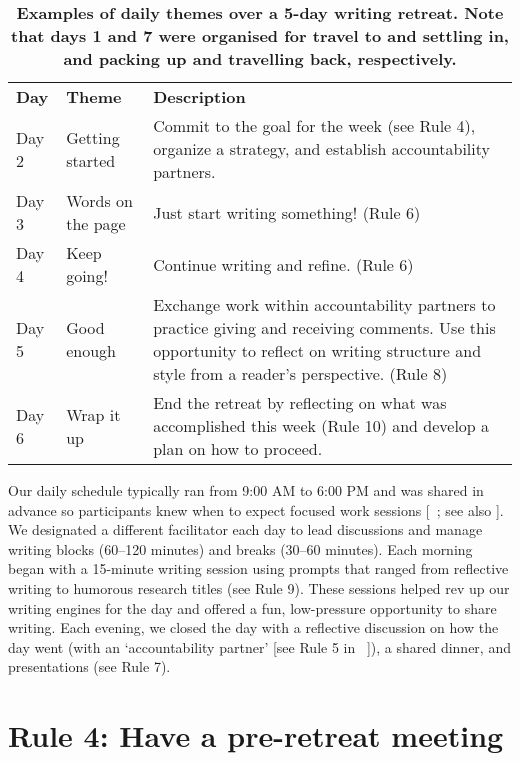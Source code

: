 \documentclass[10pt,letterpaper]{article}
\newlength\savedwidth
\newcommand\thickhline{\noalign{\global\savedwidth\arrayrulewidth\global\arrayrulewidth 2pt}%
\hline
\noalign{\global\arrayrulewidth\savedwidth}}
\begin{document}
\begin{table}[!ht]
\centering
\caption{{\bf Examples of daily themes over a 5-day writing retreat. Note that days 1 and 7 were organised for travel to and settling in, and packing up and travelling back, respectively.}}
\begin{tabular}{p{1in}p{2in}p{2in}}
\hline
{\bf Day} & {\bf Theme} & {\bf Description}\\ \thickhline
Day 2 & Getting started & Commit to the goal for the week (see Rule 4), organize a strategy, and establish accountability partners.\\ \hline
Day 3 & Words on the page & Just start writing something! (Rule 6)\\ \hline
Day 4 & Keep going! & Continue writing and refine. (Rule 6)\\ \hline
Day 5 & Good enough & Exchange work within accountability partners to practice giving and receiving comments. Use this opportunity to reflect on writing structure and style from a reader's perspective. (Rule 8)\\ \hline
Day 6 & Wrap it up & End the retreat by reflecting on what was accomplished this week (Rule 10) and develop a plan on how to proceed.\\ \hline
\end{tabular}
\label{table1}
\end{table}

Our daily schedule typically ran from 9:00 AM to 6:00 PM and was shared in advance so participants knew when to expect focused work sessions [~\cite{tremblay2021}; see also ]. We designated a different facilitator each day to lead discussions and manage writing blocks (60--120 minutes) and breaks (30--60 minutes). Each morning began with a 15-minute writing session using prompts that ranged from reflective writing to humorous research titles (see Rule 9). These sessions helped rev up our writing engines for the day and offered a fun, low-pressure opportunity to share writing. Each evening, we closed the day with a reflective discussion on how the day went (with an `accountability partner' [see Rule 5 in ~\cite{peterson2018}]), a shared dinner, and presentations (see Rule 7).

\section*{Rule 4: Have a pre-retreat meeting}
\end{document}
